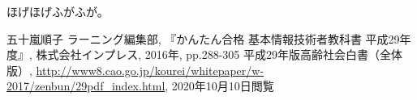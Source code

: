 \documentclass[a4paper]{ltjsarticle}
\begin{document}
ほげほげ\cite{refer1}ふがふが\cite{refer2}。

\begin{thebibliography}{9}
   五十嵐順子 ラーニング編集部, 『かんたん合格 基本情報技術者教科書 平成29年度』, 株式会社インプレス, 2016年, pp.288-305
   平成29年版高齢社会白書（全体版）, \url{http://www8.cao.go.jp/kourei/whitepaper/w-2017/zenbun/29pdf_index.html}, 2020年10月10日閲覧
\end{thebibliography}
\end{document}
